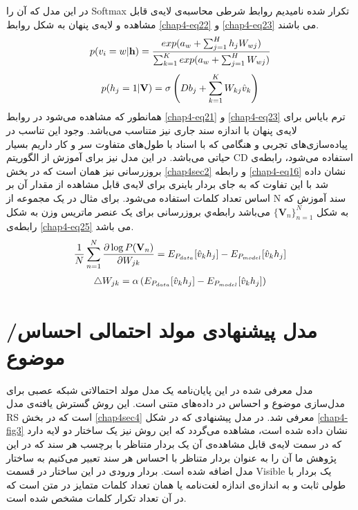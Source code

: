 در این مدل که آن را
Softmax
تکرار شده نامیدیم روابط شرطی محاسبه‌ی لایه‌ی قابل مشاهده و لایه‌ی پنهان به شکل روابط
\ref{chap4-eq22}
و
\ref{chap4-eq23}
می‌ باشند.
\begin{align}
	\centering
	\label{chap4-eq22}
	p(v_{i}=w|\textbf{h})=\dfrac{exp(a_{w}+\sum_{j=1}^{H}h_jW_{wj})}{\sum_{k=1}^{K}exp(a_{w}+\sum_{j=1}^{H}W_{wj})}
\end{align}
\begin{align}
	\centering
	\label{chap4-eq23}
	p(h_{j}=1|\textbf{V})=\sigma \left( Db_j + \sum_{k=1}^{K}W_{kj}\hat{v}_k \right)
\end{align}
همانطور که مشاهده می‌‌شود در روابط
\ref{chap4-eq21}
و
\ref{chap4-eq23}
ترم بایاس برای لایه‌ی پنهان با اندازه سند جاری نیز متناسب می‌‌باشد. وجود این تناسب در پیاده‌سازی‌های تجربی‌ و هنگامی که با اسناد با طول‌های متفاوت سر و کار داریم بسیار حیاتی می‌‌باشد. در این مدل نیز برای آموزش از الگوریتم
CD
استفاده می‌‌شود، رابطه‌ی بروزرسانی نیز همان است که در بخش
\ref{chap4sec2}
و رابطه
\ref{chap4-eq16}
نشان داده شد با این تفاوت که به جای بردار باینری برای لایه‌ی قابل مشاهده از مقدار آن بر اساس تعداد کلمات استفاده می‌‌شود. برای مثال در یک مجموعه از
N
سند آموزش که به شکل
$\{\textbf{V}_n\}_{n=1}^{N}$
می‌باشد رابطه‌ي بروزرسانی برای یک عنصر ماتریس وزن به شکل رابطه‌ی
\ref{chap4-eq25}
می‌ باشد.
\begin{align}
	\centering
	\label{chap4-eq24}
	\dfrac{1}{N}\sum_{n=1}^{N}\dfrac{\partial\log P(\textbf{V}_n)}{\partial W_{jk}} = E_{P_{data}}[\hat{v}_kh_j]-E_{P_{model}}[\hat{v}_kh_j]
\end{align}
\begin{align}
	\centering
	\label{chap4-eq25}
	\triangle W_{jk} = \alpha \left( E_{P_{data}}[\hat{v}_kh_j]-E_{P_{model}}[\hat{v}_kh_j]  \right)
\end{align}

\section{مدل پیشنهادی مولد احتمالی احساس/موضوع}
\label{chap4sec5}



مدل معرفی‌ شده در این پایان‌‌نامه یک مدل مولد احتمالاتی شبکه عصبی برای مدل‌سازی موضوع و احساس در داده‌های متنی است. این روش گسترش یافته‌ی مدل
RS
است که در بخش
\ref{chap4sec4}
معرفی شد. در مدل پیشنهادی که در شکل
\ref{chap4-fig3}
نشان داده شده است، مشاهده می‌‌گردد که این روش نیز یک ساختار دو لایه دارد که در سمت لایه‌ی قابل مشاهده‌ی آن یک بردار متناظر با برچسب هر سند که در این پژوهش ما آن را به عنوان بردار متناظر با احساس هر سند تعبیر می‌کنیم به ساختار مدل اضافه شده است. بردار ورودی در این ساختار در قسمت
Visible
یک بردار با طولی ثابت و به اندازه‌ی اندازه لغت‌نامه یا همان تعداد کلمات متمایز در متن است که در آن تعداد تکرار کلمات مشخص شده است.

